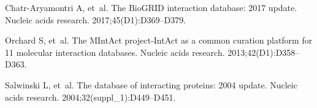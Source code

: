 \documentclass[10pt,letterpaper]{article}
\begin{document}
\begin{thebibliography}{10}
Chatr-Aryamontri A, et~al.
\newblock The BioGRID interaction database: 2017 update.
\newblock Nucleic acids research. 2017;45(D1):D369--D379.

Orchard S, et~al.
\newblock The MIntAct project-IntAct as a common curation platform for 11
  molecular interaction databases.
\newblock Nucleic acids research. 2013;42(D1):D358--D363.

Salwinski L, et~al.
\newblock The database of interacting proteins: 2004 update.
\newblock Nucleic acids research. 2004;32(suppl\_1):D449--D451.

\end{thebibliography}




\clearpage
\begin{appendices}

\end{appendices}
\end{document}
